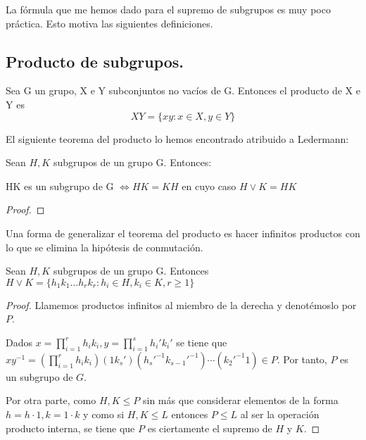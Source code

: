 La fórmula que me hemos dado para el supremo de subgrupos es muy poco práctica. Esto motiva las siguientes definiciones.

\subsection{Producto de subgrupos.}

\begin{definition}
Sea G un grupo, X e Y subconjuntos no vacíos de G. Entonces el producto de X e Y es
$$XY = \{xy:x \in X,y \in Y\}$$
\end{definition}

El siguiente teorema del producto lo hemos encontrado atribuido a Ledermann:

\begin{proposition}\label{theorem:teorema-producto}
Sean $H,K$ subgrupos de un grupo G. Entonces:

HK es un subgrupo de G $\iff HK = KH$
en cuyo caso $H \lor K = HK$
\end{proposition}
\begin{proof}

\end{proof}

Una forma de generalizar el teorema del producto es hacer infinitos productos con lo que se elimina la hipótesis de conmutación.

\begin{proposition}
Sean $H,K$ subgrupos de un grupo G. Entonces $H \lor K = \{h_1k_1...h_rk_r: h_i \in H,k_i \in K,r \ge 1\}$
\end{proposition}
\begin{proof}
Llamemos productos infinitos al miembro de la derecha y denotémoslo por $P$.

Dados $x = \prod_{i = 1}^r h_ik_i, y = \prod_{i = 1}^s h_i'k_i'$ se tiene que $xy^{-1} = (\prod_{i = 1}^r h_ik_i)(1k_s')(h_s'^{-1}k_{s-1}'^{-1})\cdots(k_2'^{-1}1) \in P$. Por tanto, $P$ es un subgrupo de $G$. 

Por otra parte, como $H,K \le P$ sin más que considerar elementos de la forma $h = h \cdot 1,k = 1 \cdot k$ y como si $H,K \le L$ entonces $P \le L$ al ser la operación producto interna, se tiene que $P$ es ciertamente el supremo de $H$ y $K$.  
\end{proof}

